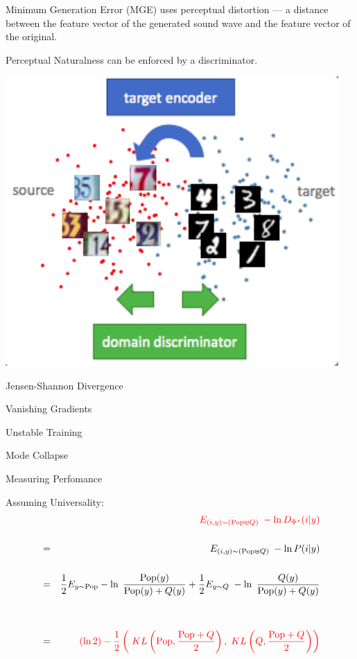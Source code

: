 {\vfill
Minimum Generation Error (MGE) uses {\color{red} perceptual distortion} ---
a distance between the feature vector of the generated sound wave and the
feature vector of the original.

\vfill
{\color{red}Perceptual Naturalness} can be enforced by a discriminator.


\centerline{\includegraphics[width = 5.0in]{../images/AdvDomainAdapt}}


\centerline{Jensen-Shannon Divergence}

\vfill
\centerline{Vanishing Gradients}

\vfill
\centerline{Unstable Training}

\vfill
\centerline{Mode Collapse}

\vfill
\centerline{Measuring Perfomance}




Assuming Universality:
\begin{eqnarray*}
& & {\color{red} E_{(i,y) \sim (\mathrm{Pop}\uplus Q)}\;-\ln D_{\Phi^*}(i|y)} \\
\\
& = & E_{(i,y) \sim (\mathrm{Pop}\uplus Q)}\;-\ln P(i|y) \\
\\
& = & \frac{1}{2}E_{y \sim \mathrm{Pop}} -\ln\;\frac{\mathrm{Pop}(y)}{\mathrm{Pop}(y) + Q(y)}+ \frac{1}{2} E_{y \sim Q}\; -\ln\;\frac{Q(y)}{\mathrm{Pop}(y) + Q(y)} \\
\\
\\
& = & {\color{red} (\ln 2) - \frac{1}{2} \left(\;KL\left(\mathrm{Pop},\frac{\mathrm{Pop}+Q}{2}\right),\;KL\left(Q,\frac{\mathrm{Pop}+Q}{2}\right)\right)}
\end{eqnarray*}

}
